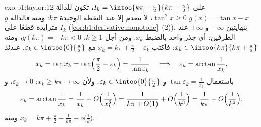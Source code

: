 \begin{solution}{exo:b1:taylor:12}
على $I_k = \intoo{k\pi - \frac\pi2}{k\pi + \frac\pi2}$، تكون
للدالة $g(x) = \tan x - x$  $\tan^2 x \geq 0$،
لا تنعدم إلا عند النقطة الوحيدة $k\pi$: ومنه فالدالة $g$ متزايدة
قطعًا على $I_k$ (\cref{cor:b1:derivative:monotone}~(2))،
بنهايتين $-\infty$ و $+\infty$ عند الطرفين: أي جذر واحد
بالضبط $x_k$. ومن أجل $k \geq 1$، $g(k\pi) = -k\pi < 0$، ومنه $x_k \in
\intoo{k\pi}{k\pi + \frac\pi2}$: فاكتب $x_k = k\pi + \frac\pi2 -
\varepsilon_k$ مع $\varepsilon_k \in \intoo{0}{\frac\pi2}$.
عندئذ
\[
x_k = \tan x_k = \tan\Bigl(\frac\pi2 - \varepsilon_k\Bigr)
= \frac{1}{\tan\varepsilon_k}
\quad\Longrightarrow\quad
\varepsilon_k = \arctan\frac{1}{x_k} ,
\]
باستعمال $\tan\varepsilon_k = \frac{1}{x_k}$ و $\varepsilon_k \in
\intoo{0}{\frac\pi2}$. ولأن $x_k \geq k\pi \to \infty$:
$\varepsilon_k \to 0$، و
\[
\varepsilon_k = \arctan\frac{1}{x_k} = \frac{1}{x_k} +
O\Bigl(\frac{1}{x_k^3}\Bigr)
= \frac{1}{k\pi + O(1)} + O\Bigl(\frac{1}{k^3}\Bigr)
= \frac{1}{k\pi} + O\Bigl(\frac{1}{k^2}\Bigr) ,
\]
ومنه $x_k = k\pi + \frac\pi2 - \frac{1}{k\pi} +
o\bigl(\frac1k\bigr)$.
\end{solution}

